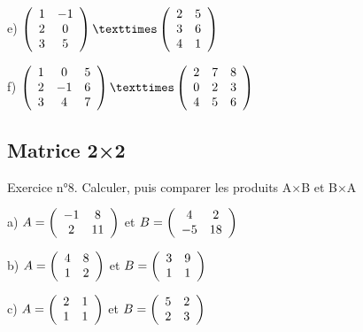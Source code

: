 \begin{minipage}[c]{.45\linewidth}
e)
$\left( \begin{array}{ c c }
 1 & -1 \\ 2 & 0 \\ 3 & 5
\end{array} \right)
×
\left( \begin{array}{ c c }
 2 & 5 \\ 3 & 6 \\ 4 & 1
\end{array} \right)$
\end{minipage}
\hfill
\begin{minipage}[c]{.45\linewidth}
f)
$\left( \begin{array}{ c c c }
 1 & 0 & 5 \\ 2 & -1 & 6 \\ 3 & 4 & 7 \\
\end{array} \right)
×
\left( \begin{array}{ c c c }
 2 & 7 & 8 \\ 0 & 2 & 3 \\ 4 & 5 & 6 \\
\end{array} \right)$
\end{minipage}

\subsection{Matrice 2×2}
Exercice n°8. Calculer, puis comparer les produits A×B et B×A

\begin{center}
a)
$ A = 
\left( \begin{array}{ c c }
 -1 & 8 \\ 2 & 11
\end{array} \right)$
et
$B =
\left( \begin{array}{ c c }
4 & 2 \\ -5 & 18
\end{array} \right)$
\end{center}

\begin{minipage}[c]{.45\linewidth}
b)
$ A = 
\left( \begin{array}{ c c }
 4 & 8 \\ 1 & 2
\end{array} \right)$
et
$ B = 
\left( \begin{array}{ c c }
 3 & 9 \\ 1 & 1
\end{array} \right)$
\end{minipage}
\hfill
\begin{minipage}[c]{.45\linewidth}
c)
$ A = 
\left( \begin{array}{ c c }
 2 & 1 \\ 1 & 1
\end{array} \right)$
et
$ B = 
\left( \begin{array}{ c c }
 5 & 2 \\ 2 & 3
\end{array} \right)$
\end{minipage}

